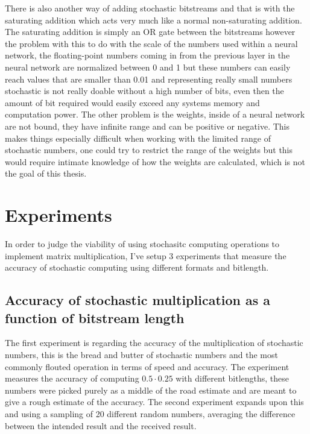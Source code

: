 \documentclass[a4paper,oneside,phd,etd]{BYUPhys}
\begin{document}
There is also another way of adding stochastic bitstreams and that is with the saturating addition which acts very much like a normal non-saturating addition. The saturating addition is simply an OR gate between the bitstreams  however the problem with this to do with the scale of the numbers used within a neural network, the floating-point numbers coming in from the previous layer in the neural network are normalized between 0 and 1 but these numbers can easily reach values that are smaller than 0.01 and representing really small numbers stochastic is not really doable without a high number of bits, even then the amount of bit required would easily exceed any systems memory and computation power. 
The other problem is the weights, inside of a neural network are not bound, they have infinite range and can be positive or negative. This makes things especially difficult when working with the limited range of stochastic numbers, one could try to restrict the range of the weights but this would require intimate knowledge of how the weights are calculated, which is not the goal of this thesis.


\section{Experiments}
In order to judge the viability of using stochasitc computing operations to implement matrix multiplication, I've setup 3 experiments that measure the accuracy of stochastic computing using different formats and bitlength.

\subsection{Accuracy of stochastic multiplication as a function of bitstream length}
The first experiment is regarding the accuracy of the multiplication of stochastic numbers, this is the bread and butter of stochastic numbers and the most commonly flouted operation in terms of speed and accuracy.
The experiment measures the accuracy of computing $0.5\cdot 0.25$ with different bitlengths, these numbers were picked purely as a middle of the road estimate and are meant to give a rough estimate of the accuracy.
The second experiment expands upon this and using a sampling of 20 different random numbers, averaging the difference between the intended result and the received result.
\end{document}

